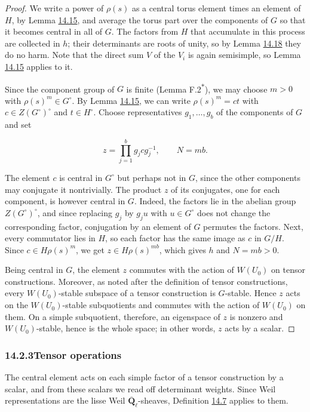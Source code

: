 \documentclass[11pt]{article}
\newcommand{\bpout}[1]{#1\textsuperscript{\hyperlink{bp-outside}{\ensuremath{\ast}}}}
\begin{document}
\begin{proof}[{Proof}]\label{bp93}%
We write a power of \(\rho(s)\) as a central torus element times an element of \(H\), by Lemma \hyperref[bp87]{14.15}, and average the torus part over the components of \(G\) so that it becomes central in all of \(G\). The factors from \(H\) that accumulate in this process are collected in \(h\); their determinants are roots of unity, so by Lemma \hyperref[bp96]{14.18} they do no harm. Note that the direct sum \(V\) of the \(V_i\) is again semisimple, so Lemma \hyperref[bp87]{14.15} applies to it.

Since the component group of \(G\) is finite (Lemma \bpout{F.2}), we may choose \(m>0\) with \(\rho(s)^m\in G^\circ\). By Lemma \hyperref[bp87]{14.15}, we can write \(\rho(s)^m=ct\) with \(c\in Z(G^\circ)^\circ\) and \(t\in H^\circ\). Choose representatives \(g_1,\ldots,g_b\) of the components of \(G\) and set

\[
z=\prod_{j=1}^bg_jcg_j^{-1},\qquad N=mb.
\]

The element \(c\) is central in \(G^\circ\) but perhaps not in \(G\), since the other components may conjugate it nontrivially. The product \(z\) of its conjugates, one for each component, is however central in \(G\). Indeed, the factors lie in the abelian group \(Z(G^\circ)^\circ\), and since replacing \(g_j\) by \(g_ju\) with \(u\in G^\circ\) does not change the corresponding factor, conjugation by an element of \(G\) permutes the factors. Next, every commutator lies in \(H\), so each factor has the same image as \(c\) in \(G/H\). Since \(c\in H\rho(s)^m\), we get \(z\in H\rho(s)^{mb}\), which gives \(h\) and \(N=mb>0\).

Being central in \(G\), the element \(z\) commutes with the action of \(W(U_0)\) on tensor constructions. Moreover, as noted after the definition of tensor constructions, every \(W(U_0)\)-stable subspace of a tensor construction is \(G\)-stable. Hence \(z\) acts on the \(W(U_0)\)-stable subquotients and commutes with the action of \(W(U_0)\) on them. On a simple subquotient, therefore, an eigenspace of \(z\) is nonzero and \(W(U_0)\)-stable, hence is the whole space; in other words, \(z\) acts by a scalar.
\end{proof}


\subsubsection*{\texorpdfstring{14.2.3\quad Tensor operations}{14.2.3 Tensor operations}}
\label{bp94}%
\label{bp95}%
The central element acts on each simple factor of a tensor construction by a scalar, and from these scalars we read off determinant weights. Since Weil representations are the lisse Weil \(\overline{\mathbf Q}_\ell\)-sheaves, Definition \hyperref[bp64]{14.7} applies to them.
\end{document}
